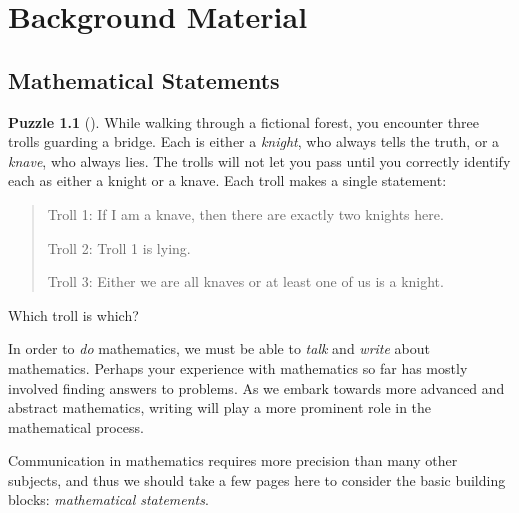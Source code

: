 \documentclass[10pt,]{book}
\theoremstyle{plain}
\theoremstyle{definition}
\theoremstyle{definition}
\theoremstyle{definition}
\newtheorem{investigation}[project]{Puzzle}
\numberwithin{equation}{chapter}
\begin{document}
\chapter[{Background Material}]{Background Material}\label{ch_additionalTopics}
\typeout{************************************************}
\typeout{************************************************}
\section[{Mathematical Statements}]{Mathematical Statements}\label{sec_background-statements}
\begin{investigation}[]\label{investigation-8}
\hypertarget{p-1733}{}%
While walking through a fictional forest, you encounter three trolls guarding a bridge. Each is either a \emph{knight}, who always tells the truth, or a \emph{knave}, who always lies. The trolls will not let you pass until you correctly identify each as either a knight or a knave. Each troll makes a single statement:%
\begin{quote}\hypertarget{blockquote-3}{}
\hypertarget{p-1734}{}%
Troll 1: If I am a knave, then there are exactly two knights here.%
\par
\hypertarget{p-1735}{}%
Troll 2: Troll 1 is lying.%
\par
\hypertarget{p-1736}{}%
Troll 3: Either we are all knaves or at least one of us is a knight.%
\end{quote}
\hypertarget{p-1737}{}%
Which troll is which?  %
\end{investigation}
\hypertarget{p-1738}{}%
In order to \emph{do} mathematics, we must be able to \emph{talk} and \emph{write} about mathematics. Perhaps your experience with mathematics so far has mostly involved finding answers to problems. As we embark towards more advanced and abstract mathematics, writing will play a more prominent role in the mathematical process.%
\par
\hypertarget{p-1739}{}%
Communication in mathematics requires more precision than many other subjects, and thus we should take a few pages here to consider the basic building blocks: \emph{mathematical statements}.%
\typeout{************************************************}
\typeout{************************************************}
\end{document}
